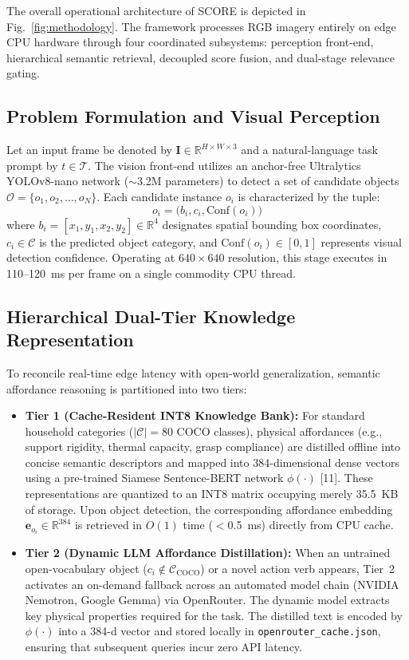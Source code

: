 \documentclass[conference]{IEEEtran}
\begin{document}
The overall operational architecture of SCORE is depicted in Fig.~\ref{fig:methodology}. The framework processes RGB imagery entirely on edge CPU hardware through four coordinated subsystems: perception front-end, hierarchical semantic retrieval, decoupled score fusion, and dual-stage relevance gating.

\subsection{Problem Formulation and Visual Perception}
Let an input frame be denoted by $\mathbf{I} \in \mathbb{R}^{H \times W \times 3}$ and a natural-language task prompt by $t \in \mathcal{T}$. The vision front-end utilizes an anchor-free Ultralytics YOLOv8-nano network ($\sim$3.2M parameters) to detect a set of candidate objects $\mathcal{O} = \{o_1, o_2, \dots, o_N\}$. Each candidate instance $o_i$ is characterized by the tuple:
\begin{equation}
    o_i = \big(b_i, c_i, \text{Conf}(o_i)\big)
    \label{eq:candidate}
\end{equation}
where $b_i = [x_1, y_1, x_2, y_2] \in \mathbb{R}^4$ designates spatial bounding box coordinates, $c_i \in \mathcal{C}$ is the predicted object category, and $\text{Conf}(o_i) \in [0, 1]$ represents visual detection confidence. Operating at $640 \times 640$ resolution, this stage executes in 110--120~ms per frame on a single commodity CPU thread.

\subsection{Hierarchical Dual-Tier Knowledge Representation}
To reconcile real-time edge latency with open-world generalization, semantic affordance reasoning is partitioned into two tiers:
\begin{itemize}
    \item \textbf{Tier 1 (Cache-Resident INT8 Knowledge Bank):} For standard household categories ($|\mathcal{C}| = 80$ COCO classes), physical affordances (e.g., support rigidity, thermal capacity, grasp compliance) are distilled offline into concise semantic descriptors and mapped into 384-dimensional dense vectors using a pre-trained Siamese Sentence-BERT network $\phi(\cdot)$ [11]. These representations are quantized to an INT8 matrix occupying merely 35.5~KB of storage. Upon object detection, the corresponding affordance embedding $\mathbf{e}_{o_i} \in \mathbb{R}^{384}$ is retrieved in $O(1)$ time ($<$0.5~ms) directly from CPU cache.
    \item \textbf{Tier 2 (Dynamic LLM Affordance Distillation):} When an untrained open-vocabulary object ($c_i \notin \mathcal{C}_{\text{COCO}}$) or a novel action verb appears, Tier~2 activates an on-demand fallback across an automated model chain (NVIDIA Nemotron, Google Gemma) via OpenRouter. The dynamic model extracts key physical properties required for the task. The distilled text is encoded by $\phi(\cdot)$ into a 384-d vector and stored locally in \texttt{openrouter\_cache.json}, ensuring that subsequent queries incur zero API latency.
\end{itemize}
\end{document}
